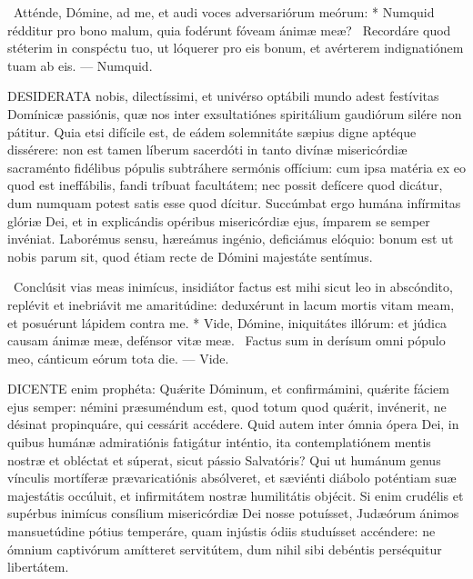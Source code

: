 \R\ Atténde, Dómine, ad me, et audi voces adversariórum meórum: * Numquid rédditur pro bono malum, quia fodérunt fóveam ánimæ meæ? \V\ Recordáre quod stéterim in conspéctu tuo, ut lóquerer pro eis bonum, et avérterem indignatiónem tuam ab eis. --- Numquid.





\lettrine[lines=2]{D}{ESIDERATA} nobis, dilectíssimi, et univérso optábili mundo adest festívitas Domínicæ passiónis, quæ nos inter exsultatiónes spiritálium gaudiórum silére non pátitur. Quia etsi difícile est, de eádem solemnitáte sæpius digne aptéque dissérere: non est tamen líberum sacerdóti in tanto divínæ misericórdiæ sacraménto fidélibus pópulis subtráhere sermónis offícium: cum ipsa matéria ex eo quod est ineffábilis, fandi tríbuat facultátem; nec possit defícere quod dicátur, dum numquam potest satis esse quod dícitur. Succúmbat ergo humána infírmitas glóriæ Dei, et in explicándis opéribus misericórdiæ ejus, ímparem se semper invéniat. Laborémus sensu, hæreámus ingénio, deficiámus elóquio: bonum est ut nobis parum sit, quod étiam recte de Dómini majestáte sentímus.

\R\ Conclúsit vias meas inimícus, insidiátor factus est mihi sicut leo in abscóndito, replévit et inebriávit me amaritúdine: deduxérunt in lacum mortis vitam meam, et posuérunt lápidem contra me. * Vide, Dómine, iniquitátes illórum: et júdica causam ánimæ meæ, defénsor vitæ meæ. \V\ Factus sum in derísum omni pópulo meo, cánticum eórum tota die. --- Vide.


\lettrine[lines=2]{D}{ICENTE} enim prophéta: Quǽrite Dóminum, et confirmámini, quǽrite fáciem ejus semper: némini præsuméndum est, quod totum quod quǽrit, invénerit, ne désinat propinquáre, qui cessárit accédere. Quid autem inter ómnia ópera Dei, in quibus humánæ admiratiónis fatigátur inténtio, ita contemplatiónem mentis nostræ et obléctat et súperat, sicut pássio Salvatóris? Qui ut humánum genus vínculis mortíferæ prævaricatiónis absólveret, et sæviénti diábolo poténtiam suæ majestátis occúluit, et infirmitátem nostræ humilitátis objécit. Si enim crudélis et supérbus inimícus consílium misericórdiæ Dei nosse potuísset, Judæórum ánimos mansuetúdine pótius temperáre, quam injústis ódiis studuísset accéndere: ne ómnium captivórum amítteret servitútem, dum nihil sibi debéntis perséquitur libertátem.

